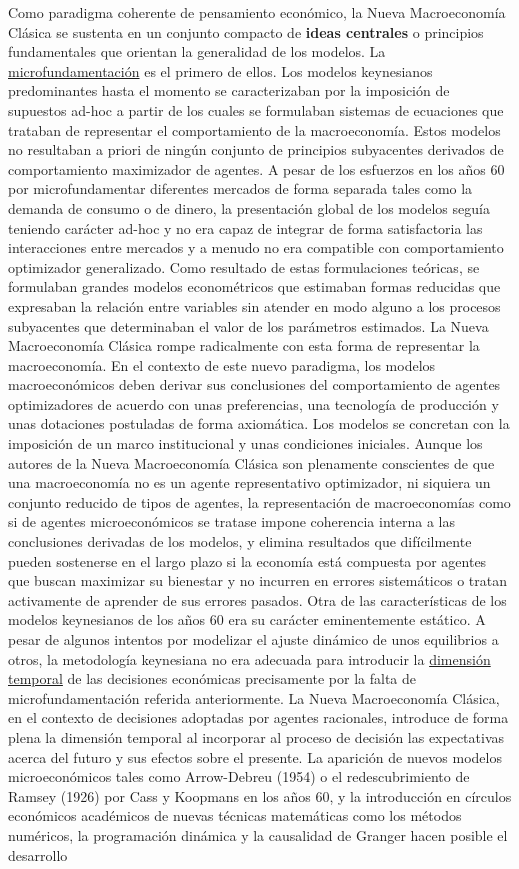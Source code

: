 \documentclass{nuevotema}
\begin{document}
Como paradigma coherente de pensamiento económico, la Nueva Macroeconomía Clásica se sustenta en un conjunto compacto de \textbf{ideas centrales} o principios fundamentales que orientan la generalidad de los modelos. La \underline{microfundamentación} es el primero de ellos. Los modelos keynesianos predominantes hasta el momento se caracterizaban por la imposición de supuestos ad-hoc a partir de los cuales se formulaban sistemas de ecuaciones que trataban de representar el comportamiento de la macroeconomía. Estos modelos no resultaban a priori de ningún conjunto de principios subyacentes derivados de comportamiento maximizador de agentes. A pesar de los esfuerzos en los años 60 por microfundamentar diferentes mercados de forma separada tales como la demanda de consumo o de dinero, la presentación global de los modelos seguía teniendo carácter ad-hoc y no era capaz de integrar de forma satisfactoria las interacciones entre mercados y a menudo no era compatible con comportamiento optimizador generalizado. Como resultado de estas formulaciones teóricas, se formulaban grandes modelos econométricos que estimaban formas reducidas que expresaban la relación entre variables sin atender en modo alguno a los procesos subyacentes que determinaban el valor de los parámetros estimados. La Nueva Macroeconomía Clásica rompe radicalmente con esta forma de representar la macroeconomía. En el contexto de este nuevo paradigma, los modelos macroeconómicos deben derivar sus conclusiones del comportamiento de agentes optimizadores de acuerdo con unas preferencias, una tecnología de producción y unas dotaciones postuladas de forma axiomática. Los modelos se concretan con la imposición de un marco institucional y unas condiciones iniciales. Aunque los autores de la Nueva Macroeconomía Clásica son plenamente conscientes de que una macroeconomía no es un agente representativo optimizador, ni siquiera un conjunto reducido de tipos de agentes, la representación de macroeconomías como si de agentes microeconómicos se tratase impone coherencia interna a las conclusiones derivadas de los modelos, y elimina resultados que difícilmente pueden sostenerse en el largo plazo si la economía está compuesta por agentes que buscan maximizar su bienestar y no incurren en errores sistemáticos o tratan activamente de aprender de sus errores pasados. Otra de las características de los modelos keynesianos de los años 60 era su carácter eminentemente estático. A pesar de algunos intentos por modelizar el ajuste dinámico de unos equilibrios a otros, la metodología keynesiana no era adecuada para introducir la \underline{dimensión temporal} de las decisiones económicas precisamente por la falta de microfundamentación referida anteriormente. La Nueva Macroeconomía Clásica, en el contexto de decisiones adoptadas por agentes racionales, introduce de forma plena la dimensión temporal al incorporar al proceso de decisión las expectativas acerca del futuro y sus efectos sobre el presente. La aparición de nuevos modelos microeconómicos tales como Arrow-Debreu (1954) o el redescubrimiento de Ramsey (1926) por Cass y Koopmans en los años 60, y la introducción en círculos económicos académicos de nuevas técnicas matemáticas como los métodos numéricos, la programación dinámica y la causalidad de Granger hacen posible el desarrollo 
\end{document}
